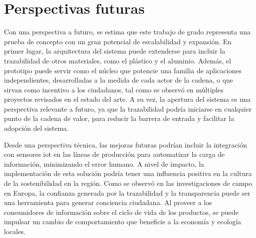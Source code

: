 \section{Perspectivas futuras}

Con una perspectiva a futuro, se estima que este trabajo de grado representa una prueba de concepto con un gran potencial de escalabilidad y expansión. En primer lugar, la arquitectura del sistema puede extenderse para incluir la trazabilidad de otros materiales, como el plástico y el aluminio. Además, el prototipo puede servir como el núcleo que potencie una familia de aplicaciones independientes, desarrolladas a la medida de cada actor de la cadena, o que sirvan como incentivo a los ciudadanos, tal como se observó en múltiples proyectos revisados en el estado del arte. A su vez, la apertura del sistema es una perspectiva relevante a futuro, ya que la trazabilidad podría iniciarse en cualquier punto de la cadena de valor, para reducir la barrera de entrada y facilitar la adopción del sistema.

Desde una perspectiva técnica, las mejoras futuras podrían incluir la integración con sensores \gls{iot} en las líneas de producción para automatizar la carga de información, minimizando el error humano. A nivel de impacto, la implementación de esta solución podría tener una influencia positiva en la cultura de la sostenibilidad en la región. Como se observó en las investigaciones de campo en Europa, la confianza generada por la trazabilidad y la transparencia puede ser una herramienta para generar conciencia ciudadana. Al proveer a los consumidores de información sobre el ciclo de vida de los productos, se puede impulsar un cambio de comportamiento que beneficie a la economía y ecología locales.
